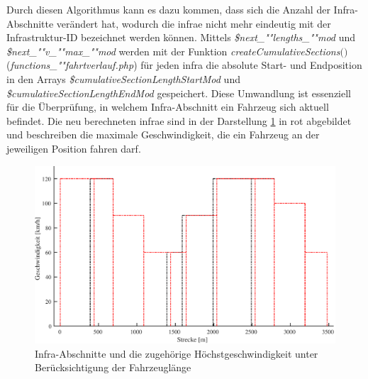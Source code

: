Durch diesen Algorithmus kann es dazu kommen, dass sich die Anzahl der Infra-Abschnitte verändert hat, wodurch die \ac{infra}e nicht mehr eindeutig mit der Infrastruktur-ID bezeichnet werden können. Mittels \textit{\$next\_""lengths\_""mod} und \textit{\$next\_""v\_""max\_""mod} werden mit der Funktion \textit{create\-Cumulative\-Sec\-tions$($$)$} (\textit{func\-tions\_""fahrt\-ver\-lauf.php}) für jeden \ac{infra} die absolute Start- und Endposition in den Arrays \textit{\$cumulative\-Section\-Length\-Start\-Mod} und \textit{\$cumulativeSectionLengthEndMod} gespeichert. Diese Umwandlung ist essenziell für die Überprüfung, in welchem Infra-Abschnitt ein Fahrzeug sich aktuell befindet. Die neu berechneten \ac{infra}e sind in der Darstellung \ref{fig:it2} in rot abgebildet und beschreiben die maximale Geschwindigkeit, die ein Fahrzeug an der jeweiligen Position fahren darf.
\begin{figure}
\includegraphics[width=\linewidth]{../images/matlab/it2.pdf}
\caption{Infra-Abschnitte und die zugehörige Höchstgeschwindigkeit unter Berücksichtigung der Fahrzeuglänge}
\label{fig:it2}
\end{figure}
